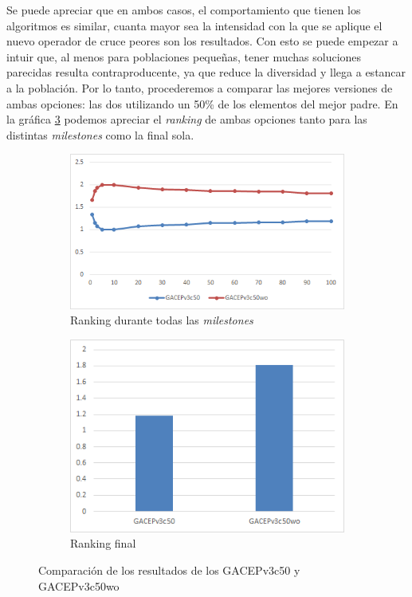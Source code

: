 Se puede apreciar que en ambos casos, el comportamiento que tienen los algoritmos es similar, cuanta mayor sea la intensidad con la que se aplique el nuevo operador de cruce peores son los resultados. 
Con esto se puede empezar a intuir que, al menos para poblaciones pequeñas, tener muchas soluciones parecidas resulta contraproducente, ya que reduce la diversidad y llega a estancar a la población. 
Por lo tanto, procederemos a comparar las mejores versiones de ambas opciones: las dos utilizando un 50\% de los elementos del mejor padre. 
En la gráfica \ref{fig:GACEPv3c} podemos apreciar el \textit{ranking} de ambas opciones tanto para las distintas \textit{milestones} como la final sola.

\begin{figure}[h]
     \centering
     \begin{subfigure}[b]{0.45\textwidth}
         \centering
         \includegraphics[width=\textwidth]{imagenes/Experimental/GACEPv3c.png}
         \caption{Ranking durante todas las \textit{milestones}}
         \label{fig:GACEPv3c_lineas}
     \end{subfigure}
     \hfill
     \begin{subfigure}[b]{0.45\textwidth}
         \centering
         \includegraphics[width=\textwidth]{imagenes/Experimental/barras/GACEPv3c.png}
         \caption{Ranking final}
         \label{fig:GACEPv3c_barras}
     \end{subfigure}
        \caption{Comparación de los resultados de los GACEPv3c50 y GACEPv3c50wo}
        \label{fig:GACEPv3c}
\end{figure}

